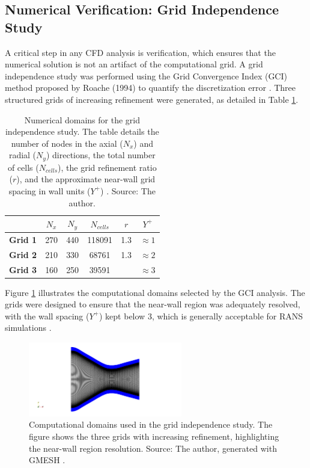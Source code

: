 \documentclass[tg, EN]{ufabcFHZh_tg}
\begin{document}
\subsection{Numerical Verification: Grid Independence Study}

A critical step in any CFD analysis is verification, which ensures that the numerical solution is not an artifact of the computational grid. A grid independence study was performed using the Grid Convergence Index (GCI) method proposed by Roache (1994) to quantify the discretization error \citep{moreira2023}. Three structured grids of increasing refinement were generated, as detailed in Table \ref{tab:grid_independence_domains}.

\begin{table}[H]
\centering
\caption{Numerical domains for the grid independence study. The table details the number of nodes in the axial ($N_x$) and radial ($N_y$) directions, the total number of cells ($N_{cells}$), the grid refinement ratio ($r$), and the approximate near-wall grid spacing in wall units ($Y^{+}$) \citep{moreira2023}. Source: The author.}
\label{tab:grid_independence_domains}
\begin{tabular}{lccccc}
\toprule
 & $N_x$ & $N_y$ & $N_{cells}$ & $r$ & $Y^{+}$ \\
\midrule
\textbf{Grid 1} & 270 & 440 & 118091 & 1.3 & $\approx1$ \\
\textbf{Grid 2} & 210 & 330 & 68761 & 1.3 & $\approx2$ \\
\textbf{Grid 3} & 160 & 250 & 39591 & & $\approx3$ \\
\bottomrule
\end{tabular}
\end{table}

Figure \ref{fig:grid_choosen} illustrates the computational domains selected by the GCI analysis. The grids were designed to ensure that the near-wall region was adequately resolved, with the wall spacing ($Y^{+}$) kept below 3, which is generally acceptable for RANS simulations \citep{moreira2023}.

\begin{figure}[H]
    \centering
    \includegraphics[width=0.6\textwidth]{Figuras/grid_choosen.png}
    \caption{Computational domains used in the grid independence study. The figure shows the three grids with increasing refinement, highlighting the near-wall region resolution. Source: The author, generated with GMESH \citep{geuzaine2009gmsh}.}
    \label{fig:grid_choosen}
\end{figure}
\end{document}

